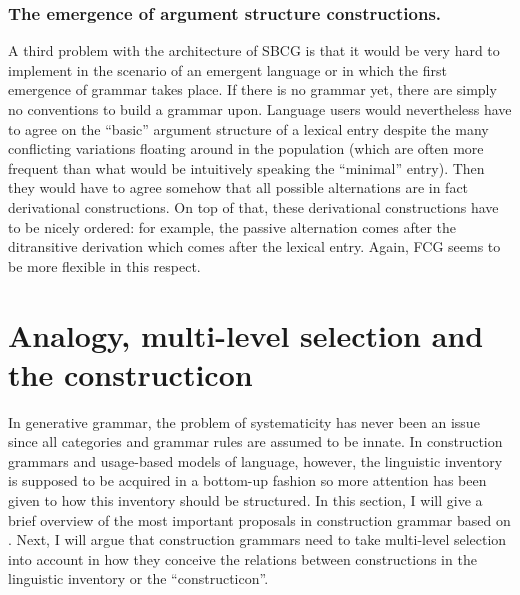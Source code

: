 \subsubsection{The emergence of argument structure constructions.}
A third problem with the architecture of SBCG is that it would be very hard to implement in the scenario of an emergent language or in which the first emergence of grammar takes place. If there is no grammar yet, there are simply no conventions to build a grammar upon. Language users would nevertheless have to agree on the ``basic'' argument structure of a lexical entry despite the many conflicting variations floating around in the population (which are often more frequent than what would be intuitively speaking the ``minimal'' entry). Then they would have to agree somehow that all possible alternations are in fact derivational constructions. On top of that, these derivational constructions have to be nicely ordered: for example, the passive alternation comes after the ditransitive derivation which comes after the lexical entry. Again, FCG seems to be more flexible in this respect.

\section{Analogy, multi-level selection and the constructicon}
\label{s:comp-constructicon}

In generative grammar, the problem of systematicity has never been an issue since all categories and grammar rules are assumed to be innate. In construction grammars and usage-based models of language, however, the linguistic inventory is supposed to be acquired in a bottom-up fashion so more attention has been given to how this inventory should be structured. In this section, I will give a brief overview of the most important proposals in construction grammar based on \citet[p. 262--290]{croft04cognitive}. Next, I will argue that construction grammars need to take multi-level selection into account in how they conceive the relations between constructions in the linguistic inventory or the ``constructicon''.

